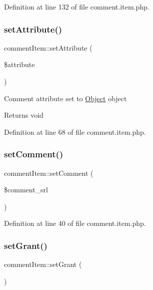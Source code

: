 Definition at line 132 of file comment.\+item.\+php.

\hypertarget{classcommentItem_a7bc40cf7b410d4ee4a4b1e978f172d06}{}\label{classcommentItem_a7bc40cf7b410d4ee4a4b1e978f172d06} 
\subsubsection{\texorpdfstring{set\+Attribute()}{setAttribute()}}
{\footnotesize\ttfamily comment\+Item\+::set\+Attribute (\begin{DoxyParamCaption}\item[{}]{\$attribute }\end{DoxyParamCaption})}

Comment attribute set to \hyperlink{classObject}{Object} object \begin{DoxyReturn}{Returns}
void 
\end{DoxyReturn}


Definition at line 68 of file comment.\+item.\+php.

\hypertarget{classcommentItem_a98724f23e262a80b73355f5b25f9c2b0}{}\label{classcommentItem_a98724f23e262a80b73355f5b25f9c2b0} 
\subsubsection{\texorpdfstring{set\+Comment()}{setComment()}}
{\footnotesize\ttfamily comment\+Item\+::set\+Comment (\begin{DoxyParamCaption}\item[{}]{\$comment\+\_\+srl }\end{DoxyParamCaption})}



Definition at line 40 of file comment.\+item.\+php.

\hypertarget{classcommentItem_a340fd95c5c60a6e2791c73cb59119d38}{}\label{classcommentItem_a340fd95c5c60a6e2791c73cb59119d38} 
\subsubsection{\texorpdfstring{set\+Grant()}{setGrant()}}
{\footnotesize\ttfamily comment\+Item\+::set\+Grant (\begin{DoxyParamCaption}{ }\end{DoxyParamCaption})}




